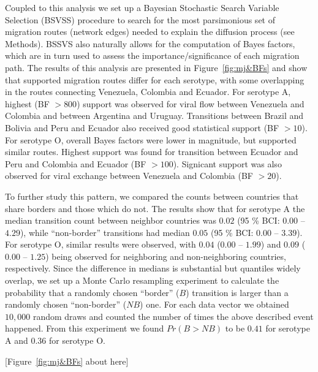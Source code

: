 \documentclass[10pt]{article}
\begin{document}
Coupled to this analysis we set up a Bayesian Stochastic Search Variable Selection (BSVSS) procedure to search for the most parsimonious set of migration routes (network edges) needed to explain the diffusion process (see Methods).
BSSVS also naturally allows for the computation of Bayes factors, which are in turn used to assess the importance/significance of each migration path.
The results of this analysis are presented in Figure~\ref{fig:mj&BFs} and show that supported migration routes differ for each serotype, with some overlapping in the routes connecting Venezuela, Colombia and Ecuador.
For serotype A, highest (BF $>800$) support was observed for viral flow between Venezuela and Colombia and between Argentina and Uruguay.
Transitions between Brazil and Bolivia and Peru and Ecuador also received good statistical support (BF $>10$).
For serotype O, overall Bayes factors were lower in magnitude, but supported similar routes.
Highest support was found for transition between Ecuador and Peru and Colombia and Ecuador (BF $>100$). Signicant support was also observed for viral exchange between Venezuela and Colombia (BF $>20$). 


To further study this pattern, we compared the counts between countries that share borders and those which do not.
The results show that for serotype A the median transition count between neighbor countries was $0.02$ (95 \% BCI: $0.00$ -- $4.29$), while ``non-border'' transitions had median $0.05$ (95 \% BCI: $0.00$ --  $3.39$).
For serotype O, similar results were observed, with $0.04$ ($0.00$ -- $1.99$) and $0.09$ ($0.00$ -- $1.25$) being observed for neighboring and non-neighboring countries, respectively.
Since the difference in medians is substantial but quantiles widely overlap, we set up a Monte Carlo resampling experiment to calculate the probability that a randomly chosen ``border'' ($B$) transition is larger than a randomly chosen ``non-border'' ($NB$) one. For each data vector we obtained $10,000$ random draws and counted the number of times the above described event happened. From this experiment we found $Pr(B>NB)$  to be $0.41$ for serotype A and $0.36$ for serotype O.

\begin{center}
 [Figure~\ref{fig:mj&BFs} about here]
\end{center}
\end{document}
